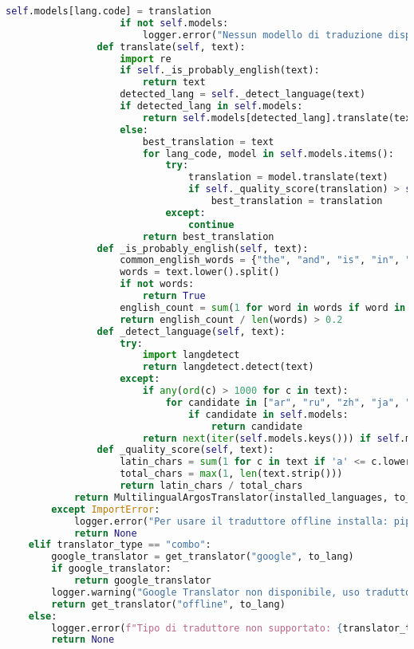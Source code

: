 \documentclass[a4paper,12pt]{article}
\begin{document}
\begin{lstlisting}[language=Python, caption=Versione 1.0 del traduttore]
                                self.models[lang.code] = translation
                    if not self.models:
                        logger.error("Nessun modello di traduzione disponibile")
                def translate(self, text):
                    import re
                    if self._is_probably_english(text):
                        return text
                    detected_lang = self._detect_language(text)
                    if detected_lang in self.models:
                        return self.models[detected_lang].translate(text)
                    else:
                        best_translation = text
                        for lang_code, model in self.models.items():
                            try:
                                translation = model.translate(text)
                                if self._quality_score(translation) > self._quality_score(best_translation):
                                    best_translation = translation
                            except:
                                continue
                        return best_translation
                def _is_probably_english(self, text):
                    common_english_words = {"the", "and", "is", "in", "to", "of", "that", "for", "it", "with"}
                    words = text.lower().split()
                    if not words:
                        return True
                    english_count = sum(1 for word in words if word in common_english_words)
                    return english_count / len(words) > 0.2
                def _detect_language(self, text):
                    try:
                        import langdetect
                        return langdetect.detect(text)
                    except:
                        if any(ord(c) > 1000 for c in text):
                            for candidate in ["ar", "ru", "zh", "ja", "ko"]:
                                if candidate in self.models:
                                    return candidate
                        return next(iter(self.models.keys())) if self.models else "en"
                def _quality_score(self, text):
                    latin_chars = sum(1 for c in text if 'a' <= c.lower() <= 'z')
                    total_chars = max(1, len(text.strip()))
                    return latin_chars / total_chars
            return MultilingualArgosTranslator(installed_languages, to_lang)
        except ImportError:
            logger.error("Per usare il traduttore offline installa: pip install argostranslate langdetect")
            return None
    elif translator_type == "combo":
        google_translator = get_translator("google", to_lang)
        if google_translator:
            return google_translator
        logger.warning("Google Translator non disponibile, uso traduttore offline")
        return get_translator("offline", to_lang)
    else:
        logger.error(f"Tipo di traduttore non supportato: {translator_type}")
        return None


\end{lstlisting}
\end{document}
